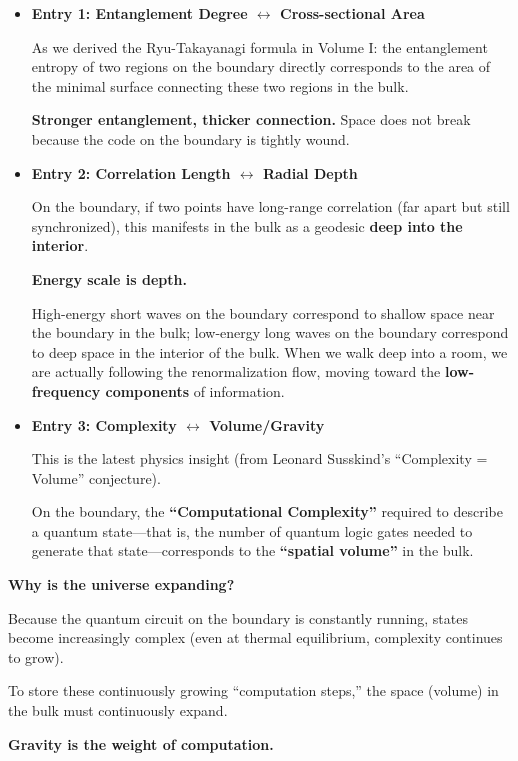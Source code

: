 \begin{itemize}
\item \textbf{Entry 1: Entanglement Degree $\leftrightarrow$ Cross-sectional Area}

   As we derived the Ryu-Takayanagi formula in Volume I: the entanglement entropy of two regions on the boundary directly corresponds to the area of the minimal surface connecting these two regions in the bulk.

   \textbf{Stronger entanglement, thicker connection.} Space does not break because the code on the boundary is tightly wound.

\item \textbf{Entry 2: Correlation Length $\leftrightarrow$ Radial Depth}

   On the boundary, if two points have long-range correlation (far apart but still synchronized), this manifests in the bulk as a geodesic \textbf{deep into the interior}.

   \textbf{Energy scale is depth.}

   High-energy short waves on the boundary correspond to shallow space near the boundary in the bulk; low-energy long waves on the boundary correspond to deep space in the interior of the bulk. When we walk deep into a room, we are actually following the renormalization flow, moving toward the \textbf{low-frequency components} of information.

\item \textbf{Entry 3: Complexity $\leftrightarrow$ Volume/Gravity}

   This is the latest physics insight (from Leonard Susskind's ``Complexity = Volume'' conjecture).

   On the boundary, the \textbf{``Computational Complexity''} required to describe a quantum state---that is, the number of quantum logic gates needed to generate that state---corresponds to the \textbf{``spatial volume''} in the bulk.
\end{itemize}

\textbf{Why is the universe expanding?}

Because the quantum circuit on the boundary is constantly running, states become increasingly complex (even at thermal equilibrium, complexity continues to grow).

To store these continuously growing ``computation steps,'' the space (volume) in the bulk must continuously expand.

\textbf{Gravity is the weight of computation.}

